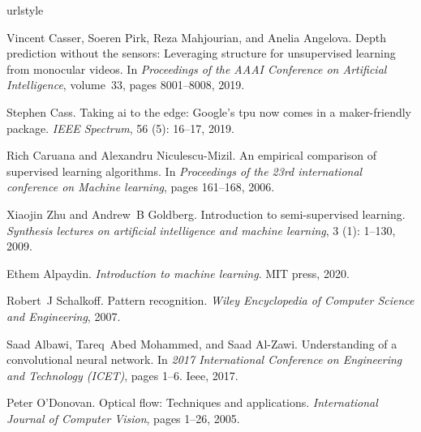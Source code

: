 \documentclass[twocolumn, switch]{article} %
\begin{document}
\normalsize
%
\begin{thebibliography}{27}
\providecommand{\natexlab}[1]{#1}
\providecommand{\url}[1]{\texttt{#1}}
\expandafter\ifx\csname urlstyle\endcsname\relax
  \providecommand{\doi}[1]{doi: #1}\else
  \providecommand{\doi}{doi: \begingroup \urlstyle{rm}\Url}\fi

Vincent Casser, Soeren Pirk, Reza Mahjourian, and Anelia Angelova.
\newblock Depth prediction without the sensors: Leveraging structure for
  unsupervised learning from monocular videos.
\newblock In \emph{Proceedings of the AAAI Conference on Artificial
  Intelligence}, volume~33, pages 8001--8008, 2019.

Stephen Cass.
\newblock Taking ai to the edge: Google's tpu now comes in a maker-friendly
  package.
\newblock \emph{IEEE Spectrum}, 56 (5): 16--17, 2019.

Rich Caruana and Alexandru Niculescu-Mizil.
\newblock An empirical comparison of supervised learning algorithms.
\newblock In \emph{Proceedings of the 23rd international conference on Machine
  learning}, pages 161--168, 2006.

Xiaojin Zhu and Andrew~B Goldberg.
\newblock Introduction to semi-supervised learning.
\newblock \emph{Synthesis lectures on artificial intelligence and machine
  learning}, 3 (1): 1--130, 2009.

Ethem Alpaydin.
\newblock \emph{Introduction to machine learning}.
\newblock MIT press, 2020.

Robert~J Schalkoff.
\newblock Pattern recognition.
\newblock \emph{Wiley Encyclopedia of Computer Science and Engineering}, 2007.

Saad Albawi, Tareq~Abed Mohammed, and Saad Al-Zawi.
\newblock Understanding of a convolutional neural network.
\newblock In \emph{2017 International Conference on Engineering and Technology
  (ICET)}, pages 1--6. Ieee, 2017.

Peter O’Donovan.
\newblock Optical flow: Techniques and applications.
\newblock \emph{International Journal of Computer Vision}, pages 1--26, 2005.


\end{thebibliography}
\end{document}
